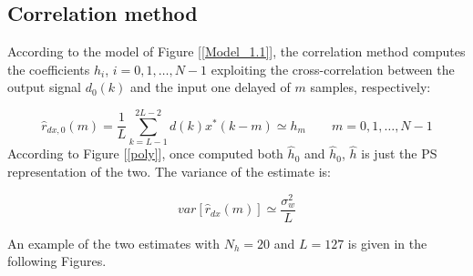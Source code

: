 \documentclass[a4paper, 12pt]{report}
\begin{document}
\subsection*{Correlation method}
According to the model of Figure [\ref{Model_1.1}], the correlation method computes the coefficients $h_i$, $i=0,1,\dots,N-1$ exploiting the cross-correlation between the output signal $d_0(k)$ and the input one delayed of $m$ samples, respectively:

\begin{equation}
\hat{r}_{dx,0}(m) = \frac{1}{L} \sum_{k=L-1}^{2L-2}d(k)x^*(k-m) \simeq h_m \quad\quad m=0,1,\dots,N-1
\end{equation}
According to Figure [\ref{poly}], once computed both $\hat{h}_0$ and $\hat{h}_0$, $\hat{h}$ is just the PS representation of the two. The variance of the estimate is:

\begin{equation*}
var[\hat{r}_{dx}(m)] \simeq \frac{\sigma_w^2}{L}
\end{equation*}

An example of the two estimates with $N_h=20$ and $L=127$ is given in the following Figures.
\end{document}
